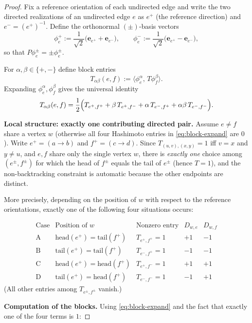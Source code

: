 \documentclass[11pt]{article}
\begin{document}
\begin{proof}
Fix a reference orientation of each undirected edge and write the two directed realizations
of an undirected edge $e$ as $e^+$ (the reference direction) and $e^-=(e^+)^{-1}$.
Define the orthonormal $(\pm)$-basis vectors
\[
\phi_e^+ := \frac{1}{\sqrt2}\bigl(\mathbf e_{e^+}+\mathbf e_{e^-}\bigr),
\qquad
\phi_e^- := \frac{1}{\sqrt2}\bigl(\mathbf e_{e^+}-\mathbf e_{e^-}\bigr),
\]
so that $P\phi_e^\pm=\pm\phi_e^\pm$.

For $\alpha,\beta\in\{+,-\}$ define block entries
\[
T_{\alpha\beta}(e,f):=\langle \phi_e^\alpha,\,T\phi_f^\beta\rangle.
\]
Expanding $\phi_e^\alpha,\phi_f^\beta$ gives the universal identity
\begin{equation}\label{eq:block-expand}
T_{\alpha\beta}(e,f)
=
\frac12\Bigl(
T_{e^+,f^+}+\beta\,T_{e^+,f^-}+\alpha\,T_{e^-,f^+}+\alpha\beta\,T_{e^-,f^-}
\Bigr).
\end{equation}

\medskip
\noindent\textbf{Local structure: exactly one contributing directed pair.}
Assume $e\neq f$ share a vertex $w$ (otherwise all four Hashimoto entries in
\eqref{eq:block-expand} are $0$). Write $e^+=(a\to b)$ and $f^+=(c\to d)$.
Since $T_{(u,v),(x,y)}=1$ iff $v=x$ and $y\neq u$, and $e,f$ share only the single
vertex $w$, there is \emph{exactly one} choice among $(e^\pm,f^\pm)$ for which the head
of $f^\pm$ equals the tail of $e^\pm$ (hence $T=1$), and the non-backtracking
constraint is automatic because the other endpoints are distinct.

More precisely, depending on the position of $w$ with respect to the reference orientations,
exactly one of the following four situations occurs:

\[
\begin{array}{c|c|c|c|c}
\text{Case} & \text{Position of }w & \text{Nonzero entry} & D_{w,e} & D_{w,f}\\\hline
\mathrm{A} & \mathrm{head}(e^+)=\mathrm{tail}(f^+) & T_{e^+,f^+}=1 & +1 & -1\\
\mathrm{B} & \mathrm{tail}(e^+)=\mathrm{tail}(f^+) & T_{e^-,f^+}=1 & -1 & -1\\
\mathrm{C} & \mathrm{head}(e^+)=\mathrm{head}(f^+) & T_{e^+,f^-}=1 & +1 & +1\\
\mathrm{D} & \mathrm{tail}(e^+)=\mathrm{head}(f^+) & T_{e^-,f^-}=1 & -1 & +1
\end{array}
\]
(All other entries among $T_{e^\pm,f^\pm}$ vanish.)

\medskip
\noindent\textbf{Computation of the blocks.}
Using \eqref{eq:block-expand} and the fact that exactly one of the four terms is $1$:


\end{proof}
\end{document}
